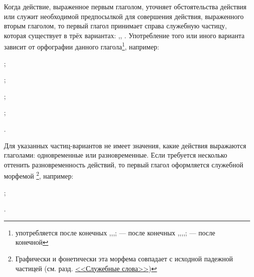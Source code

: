 Когда действие, выраженное первым глаголом, уточняет обстоятельства действия или служит необходимой предпосылкой для совершения действия, выраженного вторым глаголом, то первый глагол принимает справа служебную частицу, которая существует в трёх вариантах: ,, . Употребление того или иного варианта зависит от орфографии данного глагола\footnote[36]{ употребляется после конечных ,,,;  --- после конечных ,,,,;  --- после конечной }, например:
\begin{prfsample}
	\item {};
	\item {};
	\item {};
	\item {};
	\item {}.
\end{prfsample}

Для указанных частиц-вариантов не имеет значения, какие действия выражаются глаголами: одновременные или разновременные. Если требуется несколько оттенить разновременность действий, то первый глагол оформляется служебной морфемой \footnote[37]{Графически и фонетически эта морфема совпадает с исходной падежной частицей (см. разд. \hyperref[sec:ss]{<<Служебные слова>>})}, например:
\begin{prfsample}
	\item {};
	\item {}.
\end{prfsample}

